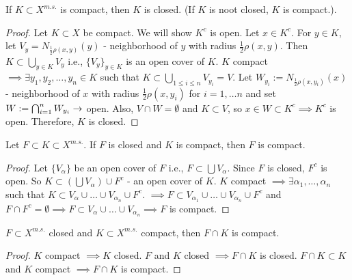 \documentclass[]{article}
\begin{document}
\begin{theorem}
	If $K\subset X^{m.s.}$ is compact, then $K$ is closed. (If $K$ is noot closed, $K$ is compact.).
\end{theorem}
\begin{proof}
	Let $K\subset X$ be compact. We will show $K^c$ is open.
	Let $x\in K^c$. For $y\in K$, let $V_y = N_{\frac{1}{2}\rho(x,y)}(y)$ - neighborhood of $y$ with radius $\frac{1}{2}\rho(x,y)$.
	Then $K\subset \bigcup_{y\in K}V_y$ i.e., $\{V_y\}_{y\in K}$ is an open cover of $K$.
	$K$ compact $\implies \exists y_1,y_2,\dots,y_n\in K$ such that $K\subset \bigcup_{1\leq i\leq n} V_{y_i} = V$.
	Let $W_{y_i} := N_{\frac{1}{2}\rho(x,y_i)}(x)$ - neighborhood of $x$ with radius $\frac{1}{2}\rho(x,y_i)$ for $i = 1,\dots n$ and set $W:=\bigcap_{i=1}^n W_{y_i} \rightarrow$ open.
	Also, $V\cap W = \emptyset$ and $K\subset V$, so $x\in W\subset K^c \implies K^c$ is open.
	Therefore, $K$ is closed.
\end{proof}

\begin{theorem}
	Let $F\subset K\subset X^{m.s.}$.
	If $F$ is closed and $K$ is compact, then $F$ is compact.
\end{theorem}
\begin{proof}
	Let $\{V_\alpha\}$ be an open cover of $F$ i.e., $F\subset \bigcup V_\alpha$.
	Since $F$ is closed, $F^c$ is open. So $K\subset (\bigcup V_\alpha) \cup F^c$ - an open cover of $K$.
	$K$ compact $\implies \exists \alpha_1,\dots,\alpha_n$ such that $K\subset V_\alpha \cup\dots\cup V_{\alpha_n}\cup F^c$. $\implies F\subset V_{\alpha_1}\cup\dots\cup V_{\alpha_n}\cup F^c$ and $F\cap F^c = \emptyset \implies F\subset V_\alpha\cup\dots\cup V_{\alpha_n} \implies F$ is compact.
\end{proof}
\begin{corollary}
	$F\subset X^{m.s.}$ closed and $K\subset X^{m.s.}$ compact, then $F\cap K$ is compact.
\end{corollary}
\begin{proof}
	$K$ compact $\implies K$ closed. $F$ and $K$ closed $\implies F \cap K$ is closed.
	$F\cap K\subset K$ and $K$ compact $\implies F\cap K$ is compact.
\end{proof}
\end{document}
